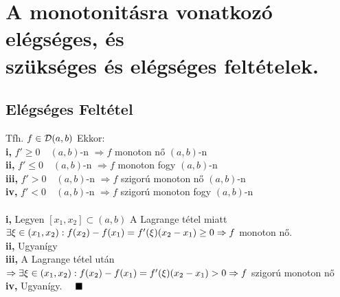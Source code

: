 \documentclass[a4paper,12pt]{article}
\begin{document}
\section{A monotonitásra vonatkozó elégséges, és \\ szükséges és elégséges feltételek.}
\subsection{Elégséges Feltétel}
\tetel Tfh. $f\in \displaystyle\mathcal{D}(a,b)$ Ekkor: \\[0.1cm]\hspace*{0.3cm}\textbf{i,} $f'\geq0\quad(a,b)$-n
$\Rightarrow f$ monoton nő $(a,b)$-n\\[0.1cm]\hspace*{0.3cm}\textbf{ii,}
$f'\leq0\quad(a,b)$-n $\Rightarrow f$ monoton fogy $(a,b)$-n\\[0.1cm]
\hspace*{0.3cm}\textbf{iii,} $f'>0\quad (a,b)$-n $\Rightarrow f$ szigorú monoton nő
$(a,b)$-n\\[0.1cm]\hspace*{0.3cm}\textbf{iv,} $f'<0\quad (a,b)$-n $\Rightarrow f$
szigorú monoton fogy $(a,b)$-n\\[0.2cm]\biz \\[0.1cm]\textbf{i,} Legyen
$[x_1,x_2]\subset(a,b)$ A Lagrange tétel miatt $\exists\xi\in
(x_1,x_2):\\[0.2cm]f(x_2)-f(x_1)=f'(\xi)(x_2-x_1)\geq0\Rightarrow f$ monoton
nő.\\[0.1cm]\textbf{ii,} Ugyanígy\\[0.1cm]\textbf{iii,} A Lagrange tétel után
$\Rightarrow\exists\xi\in (x_1,x_2):\\[0.2cm]f(x_2)-f(x_1)=f'(\xi)(x_2-x_1)>0
\Rightarrow f$ szigorú monoton nő\\[0.1cm]\textbf{iv,} Ugyanígy. $\quad\blacksquare$
\end{document}
